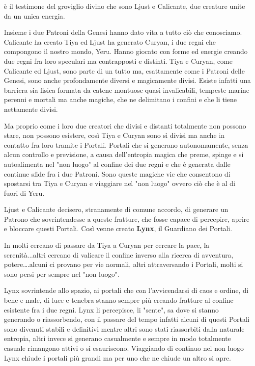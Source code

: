 \documentclass[a4paper,11pt,twoside,openany]{book}
\begin{document}
è il testimone del groviglio divino che sono Ljust e Calicante, due creature unite da un unica energia.

Insieme i due Patroni della Genesi hanno dato vita a tutto ciò che conosciamo. Calicante ha creato Tiya ed Ljust ha generato Curyan, i due regni che compongono il nostro mondo, Yeru. Hanno giocato con forme ed energie creando due regni fra loro speculari ma contrapposti e distinti. Tiya e Curyan, come Calicante ed Ljust, sono parte di un tutto ma, esattamente come i Patroni delle Genesi, sono anche profondamente diversi e magicamente divisi. Esiste infatti una barriera sia fisica formata da catene montuose quasi invalicabili, tempeste marine perenni e mortali ma anche magiche, che ne delimitano i confini e che li tiene nettamente divisi.

Ma proprio come i loro due creatori che divisi e distanti totalmente non possono stare, non possono esistere, così Tiya e Curyan sono sì divisi ma anche in contatto fra loro tramite i Portali. Portali che si generano autonomamente, senza alcun controllo e previsione, a causa dell'entropia magica che preme, spinge e si autoalimenta nel "non luogo" al confine dei due regni e che è generata dalle continue sfide fra i due Patroni. Sono queste magiche vie che consentono di spostarsi tra Tiya e Curyan e viaggiare nel "non luogo" ovvero ciò che è al di fuori di Yeru.

Ljust e Calicante decisero, stranamente di comune accordo, di generare un Patrono che sovrintendesse a queste fratture, che fosse capace di percepire, aprire e bloccare questi Portali. Così venne creato \textbf{Lynx}, il Guardiano dei Portali.

In molti cercano di passare da Tiya a Curyan per cercare la pace, la serenità...altri cercano di valicare il confine inverso alla ricerca di avventura, potere\ldots .alcuni ci provano per vie normali, altri attraversando i Portali, molti si sono persi per sempre nel "non luogo".

Lynx sovrintende allo spazio, ai portali che con l'avvicendarsi di caos e ordine, di bene e male, di luce e tenebra stanno sempre più creando fratture al confine esistente fra i due regni. Lynx li percepisce, li "sente", sa dove si stanno generando o riassorbendo, con il passare del tempo infatti alcuni di questi Portali sono divenuti stabili e definitivi mentre altri sono stati riassorbiti dalla naturale entropia, altri invece si generano casualmente e sempre in modo totalmente casuale rimangono attivi o si esauriscono. Viaggiando di continuo nel non luogo Lynx chiude i portali più grandi ma per uno che ne chiude un altro si apre.
\end{document}
